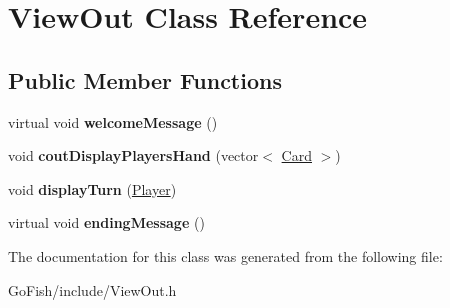 \hypertarget{class_view_out}{\section{View\-Out Class Reference}
\label{class_view_out}
}
\subsection*{Public Member Functions}
\begin{DoxyCompactItemize}
\item 
\hypertarget{class_view_out_a4689f97048cd61ab7df83a3158d03ee7}{virtual void {\bfseries welcome\-Message} ()}\label{class_view_out_a4689f97048cd61ab7df83a3158d03ee7}

\item 
\hypertarget{class_view_out_aa284dd2c46946728bfbeb61f79bdbc1c}{void {\bfseries cout\-Display\-Players\-Hand} (vector$<$ \hyperlink{class_card}{Card} $>$)}\label{class_view_out_aa284dd2c46946728bfbeb61f79bdbc1c}

\item 
\hypertarget{class_view_out_adc9f94c7824bbaf97193cf51a06088dc}{void {\bfseries display\-Turn} (\hyperlink{class_player}{Player})}\label{class_view_out_adc9f94c7824bbaf97193cf51a06088dc}

\item 
\hypertarget{class_view_out_a6b8f759a8a7a05ed0f271ee564258f9e}{virtual void {\bfseries ending\-Message} ()}\label{class_view_out_a6b8f759a8a7a05ed0f271ee564258f9e}

\end{DoxyCompactItemize}


The documentation for this class was generated from the following file\-:\begin{DoxyCompactItemize}
\item 
Go\-Fish/include/View\-Out.\-h\end{DoxyCompactItemize}
